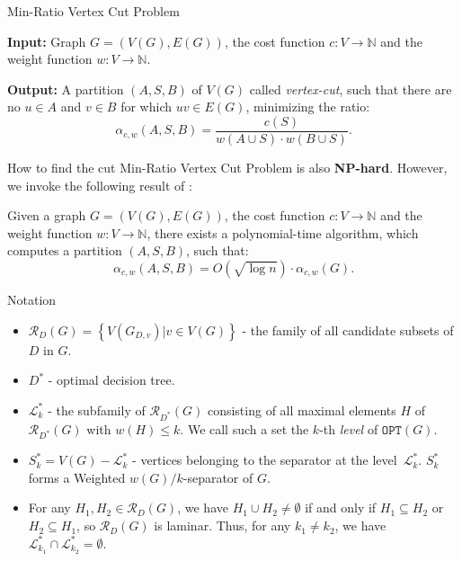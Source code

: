 \documentclass{beamer}
\newcommand{\br}[1]{\mathopen{}\left( #1 \right)}
\newcommand{\brc}[1]{\mathopen{}\left\{ #1 \right\}}
\newcommand{\OPT}{\texttt{OPT}}
\begin{document}
\begin{frame}{Min-Ratio Vertex Cut Problem}

\begin{tcolorbox}[colback=white, title= Min-Ratio Vertex Cut Problem, fonttitle=\bfseries, breakable]
\textbf{Input:} Graph $G=\br{V\br{G}, E\br{G}}$, the cost function $c:V\to \mathbb{N}$ and the weight function $w:V\to \mathbb{N}$.

\pause
\textbf{Output:} A partition $\br{A,S,B}$ of $V\br{G}$ called \textit{vertex-cut}, such that there are no $u\in A$ and $v\in B$ for which $uv\in E\br{G}$, minimizing the ratio:
$$
\alpha_{c,w}\br{A,S,B}=\frac{c\br{S}}{w\br{A\cup S}\cdot w\br{B\cup S}}.
$$
\end{tcolorbox}
\end{frame}

\begin{frame}{How to find the cut}
Min-Ratio Vertex Cut Problem is also \textbf{NP-hard}. However, we invoke the following result of \cite{Improvedapproximationalgorithmsvertexseparators}:
\begin{theorem}\label{approxmrvc}
    Given a graph $G=\br{V\br{G}, E\br{G}}$, the cost function $c:V\to\mathbb{N}$ and the weight function $w:V\to \mathbb{N}$, there exists a
polynomial-time algorithm, which computes a partition $(A, S, B)$, such that:
$$
\alpha_{c,w}\br{A,S,B}=O\br{\sqrt{\log n
}}\cdot\alpha_{c,w}\br{G}.
$$
\end{theorem}
\end{frame}

\begin{frame}{Notation}
    \begin{itemize}
        \item $\mathcal{R}_D\br{G} = \brc{V\br{G_{D,v}} | v \in V\br{G}}$ - 
the family of all candidate subsets of $D$ in $G$.
        \item $D^*$ - optimal decision tree.
        \item $\mathcal{L}_{k}^*$ - the subfamily of $\mathcal{R}_{D^*}\br{G}$
        consisting of all maximal elements $H$ of $\mathcal{R}_{D^*}\br{G}$ with $w\br{H} \leq k$. We call such a set the $k$-th \textit{level} of $\OPT\br{G}$. 
        \item $S_{k}^* = V\br{G} - \mathcal{L}_{k}^*$ - vertices belonging to the separator at the level~$\mathcal{L}_{k}^*$. $S_{k}^*$ forms a Weighted $w\br{G}/k$-separator of $G$.
        \item For any $H_1, H_2 \in \mathcal{R}_D\br{G}$, we have 
$H_1 \cup H_2 \neq \emptyset$ if and only if $H_1 \subseteq H_2$ or 
$H_2 \subseteq H_1$, so $\mathcal{R}_D\br{G}$ is laminar. Thus, for any $k_1 \neq k_2$, we have 
$\mathcal{L}_{k_1}^* \cap \mathcal{L}_{k_2}^* = \emptyset$.
    \end{itemize}

\end{frame}
\end{document}
